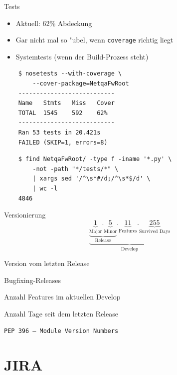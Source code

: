 \documentclass{beamer}
\begin{document}
\begin{frame}[fragile]{Tests}
	\begin{itemize}
		\item Aktuell: 62\% Abdeckung
		\item Gar nicht mal so "ubel, wenn \texttt{coverage} richtig liegt
		\item Systemtests (wenn der Build-Prozess steht)
	\end{itemize}
	
	\begin{overprint}
	\begin{verbatim}
	$ nosetests --with-coverage \
		--cover-package=NetqaFwRoot
	---------------------------
	Name   Stmts   Miss   Cover
	TOTAL  1545    592    62%
	---------------------------
	Ran 53 tests in 20.421s
	FAILED (SKIP=1, errors=8)
	\end{verbatim}
	
	\begin{verbatim}
	$ find NetqaFwRoot/ -type f -iname '*.py' \
		-not -path "*/tests/*" \
		| xargs sed '/^\s*#/d;/^\s*$/d' \
		| wc -l
	4846
	\end{verbatim}
	\end{overprint}
\end{frame}

\begin{frame}{Versionierung}
	\begin{equation*}
		\underbrace{\underbrace{\underbrace{1}_{\text{Major}}.\underbrace{5}_{\text{Minor}}}_{\text{Release}}.\underbrace{11}_{\text{Features}}.\underbrace{255}_{\text{Survived Days}}}_{\text{Develop}}
	\end{equation*}
	\vfill
	\begin{description}[Survived Days:]
		\item[Major:] Version vom letzten Release
		\item[Minor:] Bugfixing-Releases
		\item[Features:] Anzahl Features im aktuellen Develop
		\item[Survived Days:] Anzahl Tage seit dem letzten Release
		\item[Ansonsten:] \texttt{PEP\,396 -- Module Version Numbers}
	\end{description}
\end{frame}

\section{JIRA}
\end{document}

